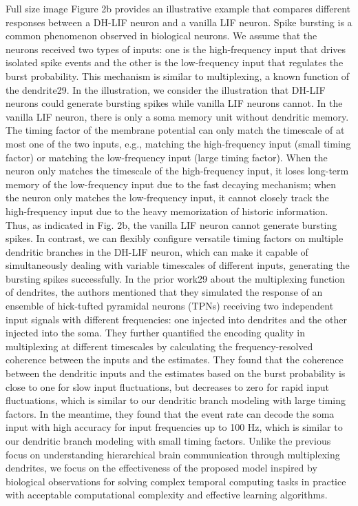Full size image
Figure 2b provides an illustrative example that compares different responses between a DH-LIF neuron and a vanilla LIF neuron. Spike bursting is a common phenomenon observed in biological neurons. We assume that the neurons received two types of inputs: one is the high-frequency input that drives isolated spike events and the other is the low-frequency input that regulates the burst probability. This mechanism is similar to multiplexing, a known function of the dendrite29. In the illustration, we consider the illustration that DH-LIF neurons could generate bursting spikes while vanilla LIF neurons cannot. In the vanilla LIF neuron, there is only a soma memory unit without dendritic memory. The timing factor of the membrane potential can only match the timescale of at most one of the two inputs, e.g., matching the high-frequency input (small timing factor) or matching the low-frequency input (large timing factor). When the neuron only matches the timescale of the high-frequency input, it loses long-term memory of the low-frequency input due to the fast decaying mechanism; when the neuron only matches the low-frequency input, it cannot closely track the high-frequency input due to the heavy memorization of historic information. Thus, as indicated in Fig. 2b, the vanilla LIF neuron cannot generate bursting spikes. In contrast, we can flexibly configure versatile timing factors on multiple dendritic branches in the DH-LIF neuron, which can make it capable of simultaneously dealing with variable timescales of different inputs, generating the bursting spikes successfully. In the prior work29 about the multiplexing function of dendrites, the authors mentioned that they simulated the response of an ensemble of hick-tufted pyramidal neurons (TPNs) receiving two independent input signals with different frequencies: one injected into dendrites and the other injected into the soma. They further quantified the encoding quality in multiplexing at different timescales by calculating the frequency-resolved coherence between the inputs and the estimates. They found that the coherence between the dendritic inputs and the estimates based on the burst probability is close to one for slow input fluctuations, but decreases to zero for rapid input fluctuations, which is similar to our dendritic branch modeling with large timing factors. In the meantime, they found that the event rate can decode the soma input with high accuracy for input frequencies up to 100 Hz, which is similar to our dendritic branch modeling with small timing factors. Unlike the previous focus on understanding hierarchical brain communication through multiplexing dendrites, we focus on the effectiveness of the proposed model inspired by biological observations for solving complex temporal computing tasks in practice with acceptable computational complexity and effective learning algorithms.

